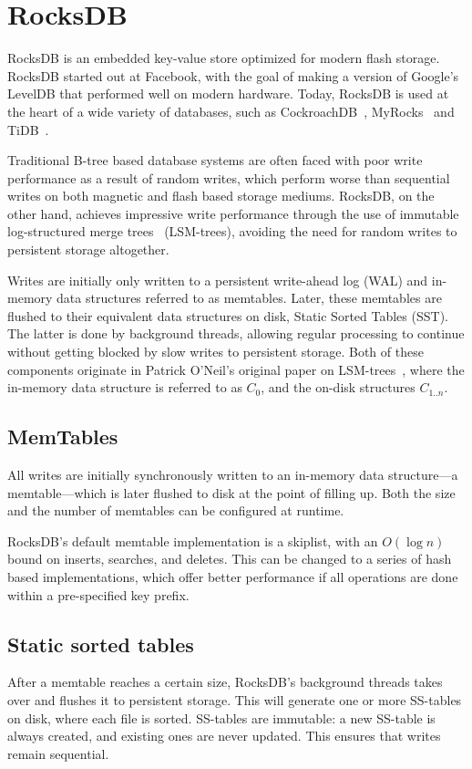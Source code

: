 \section{RocksDB}\label{sec:rocksdb}
RocksDB is an embedded key-value store optimized for modern flash storage.
RocksDB started out at Facebook, with the goal of making a version of Google's
LevelDB that performed well on modern hardware. Today, RocksDB is used at the
heart of a wide variety of databases, such as CockroachDB~\cite{cockroach},
MyRocks~\cite{myrocks} and TiDB~\cite{tidb}.

Traditional B-tree based database systems are often faced with poor write
performance as a result of random writes, which perform worse than sequential
writes on both magnetic and flash based storage mediums. RocksDB, on the other
hand, achieves impressive write performance through the use of immutable
log-structured merge trees~\cite{lsm} (LSM-trees), avoiding the need for random
writes to persistent storage altogether.

Writes are initially only written to a persistent write-ahead log (WAL) and
in-memory data structures referred to as memtables. Later, these memtables are
flushed to their equivalent data structures on disk, Static Sorted Tables (SST).
The latter is done by background threads, allowing regular processing to
continue without getting blocked by slow writes to persistent storage. Both of
these components originate in Patrick O'Neil's original paper on
LSM-trees~\cite{lsm}, where the in-memory data structure is referred to as $ C_0
$, and the on-disk structures $ C_{1..n} $.


\subsection{MemTables}
All writes are initially synchronously written to an in-memory data structure---a
memtable---which is later flushed to disk at the point of filling up. Both the
size and the number of memtables can be configured at runtime.

RocksDB's default memtable implementation is a skiplist, with an $ O(\log n) $
bound on inserts, searches, and deletes. This can be changed to a series of hash
based implementations, which offer better performance if all operations are done
within a pre-specified key prefix.

\subsection{Static sorted tables}
After a memtable reaches a certain size, RocksDB's background threads takes over
and flushes it to persistent storage. This will generate one or more SS-tables
on disk, where each file is sorted. SS-tables are immutable: a new SS-table is
always created, and existing ones are never updated. This ensures that writes
remain sequential.

